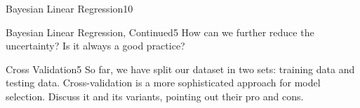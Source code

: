 \begin{questions}
\begin{question}{Bayesian Linear Regression}{10}
\begin{answer}\end{answer}
\end{question}


\begin{question}{Bayesian Linear Regression, Continued}{5}
How can we further reduce the uncertainty? Is it always a good practice?

\begin{answer}\end{answer}
\end{question}


\begin{question}[bonus]{Cross Validation}{5}
So far, we have split our dataset in two sets: training data and testing data. Cross-validation is a more sophisticated approach for model selection. Discuss it and its variants, pointing out their pro and cons.
\end{question}

\begin{answer}\end{answer}

\end{questions}
